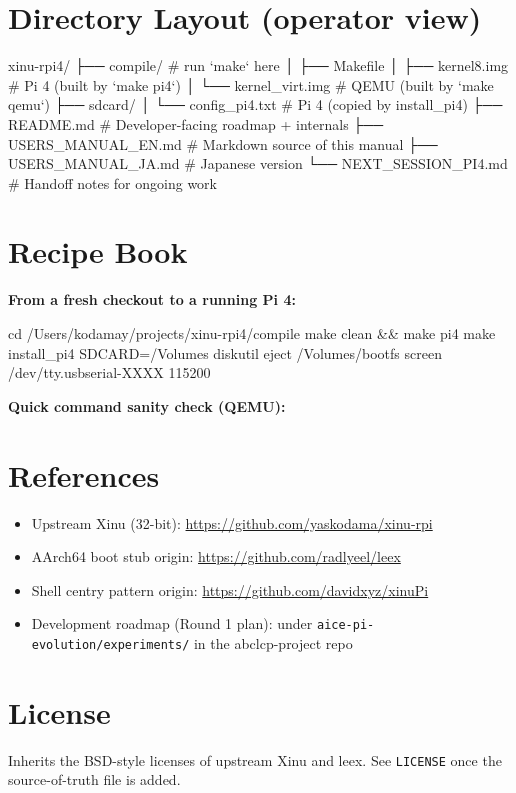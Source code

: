 \documentclass[a4paper,11pt]{article}
\begin{document}
\section{Directory Layout (operator view)}
\begin{code}
xinu-rpi4/
├── compile/                # run `make` here
│   ├── Makefile
│   ├── kernel8.img         # Pi 4 (built by `make pi4`)
│   └── kernel_virt.img     # QEMU (built by `make qemu`)
├── sdcard/
│   └── config_pi4.txt      # Pi 4 (copied by install_pi4)
├── README.md               # Developer-facing roadmap + internals
├── USERS_MANUAL_EN.md      # Markdown source of this manual
├── USERS_MANUAL_JA.md      # Japanese version
└── NEXT_SESSION_PI4.md     # Handoff notes for ongoing work
\end{code}

\section{Recipe Book}
\textbf{From a fresh checkout to a running Pi 4:}
\begin{code}
cd /Users/kodamay/projects/xinu-rpi4/compile
make clean && make pi4
make install_pi4 SDCARD=/Volumes
diskutil eject /Volumes/bootfs
screen /dev/tty.usbserial-XXXX 115200
\end{code}
\textbf{Quick command sanity check (QEMU):}

\section{References}
\begin{itemize}[leftmargin=1.4em,itemsep=1pt]
\item Upstream Xinu (32-bit): \url{https://github.com/yaskodama/xinu-rpi}
\item AArch64 boot stub origin: \url{https://github.com/radlyeel/leex}
\item Shell centry pattern origin: \url{https://github.com/davidxyz/xinuPi}
\item Development roadmap (Round 1 plan): under
  \verb|aice-pi-evolution/experiments/| in the abclcp-project repo
\end{itemize}

\section{License}
Inherits the BSD-style licenses of upstream Xinu and leex. See \verb|LICENSE|
once the source-of-truth file is added.
\end{document}
